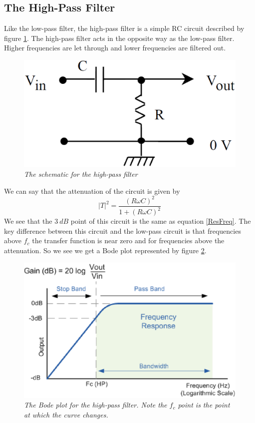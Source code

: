 \documentclass[11pt]{article}
\numberwithin{equation}{section}
\numberwithin{figure}{section}
\numberwithin{table}{section}
\begin{document}
\subsection{The High-Pass Filter}
Like the low-pass filter, the high-pass filter is a simple RC circuit described by figure \ref{FigHighPass}. The high-pass filter acts in the opposite way as the low-pass filter. Higher frequencies are let through and lower frequencies are filtered out.
\begin{figure}[h]
\centering
\includegraphics[scale=0.20]{HighPass.eps}
\caption{\textit{The schematic for the high-pass filter}}
\label{FigHighPass}
\end{figure}
We can say that the attenuation of the circuit is given by
\begin{equation}
|T|^2 = \frac{(R\omega C)^2}{1+(R\omega C)^2}
\label{AttenHighPass}
\end{equation}
We see that the $3\ dB$ point of this circuit is the same as equation \ref{ResFreq}. The key difference between this circuit and the low-pass circuit is that frequencies above $f_c$ the transfer function is near zero and for frequencies above the attenuation. So we see we get a Bode plot represented by figure \ref{BodeHighPass}.
\begin{figure}[h]
\centering
\includegraphics[scale=0.65]{BodeHighPass.eps}
\caption{\textit{The Bode plot for the high-pass filter. Note the $f_c$ point is the point at which the curve changes.}}
\label{BodeHighPass}
\end{figure}
\end{document}
